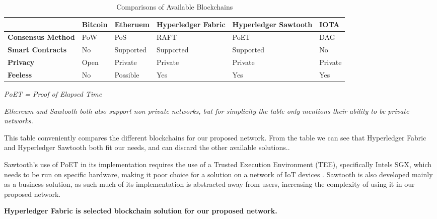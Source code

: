 \begin{table}[htb]
    \caption{Comparisons of Available Blockchains}
    \renewcommand{\arraystretch}{2}
    \begin{tabular}{|p{2cm}|p{1.5cm}|p{2cm}|p{2.2cm}|p{2.2cm}|p{2cm}|}
      \hline
        \textbf{}                 & \textbf{Bitcoin} & \textbf{Etheruem}             & \textbf{Hyperledger Fabric} & \textbf{Hyperledger Sawtooth} & \textbf{IOTA} \\[10pt] \hline 
        \textbf{Consensus Method} & PoW              & PoS                           & RAFT                                  & PoET             & DAG           \\ \hline 
        \textbf{Smart Contracts}  & No               & Supported                     & Supported                   & Supported                     & No            \\[10pt] \hline 
        \textbf{Privacy}          & Open   & Private & Private                & Private & Private           \\[10pt] \hline 
        \textbf{Feeless}          & No               & Possible                      & Yes                         & Yes                           & Yes           \\[10pt] \hline 
    \end{tabular}
\end{table}
 \textbf{ }

\textit{PoET = Proof of Elapsed Time}

\textit{Ethereum and Sawtooth both also support non private networks, but for simplicity the table only mentions their ability to be private networks.}


This table conveniently compares the different blockchains for our proposed network. From the table we can see that Hyperledger Fabric and Hyperledger Sawtooth both fit our needs, and can discard the other available solutions.. 

Sawtooth's use of PoET in its implementation requires the use of a Trusted Execution Environment (TEE), specifically Intels SGX, which needs to be run on specific hardware, making it poor choice for a solution on a network of IoT devices \cite{Linux2018Intro}. Sawtooth is also developed mainly as a business solution, as such much of its implementation is abstracted away from users, increasing the complexity of using it in our proposed network.

\textbf{Hyperledger Fabric is selected blockchain solution for our proposed network.}


